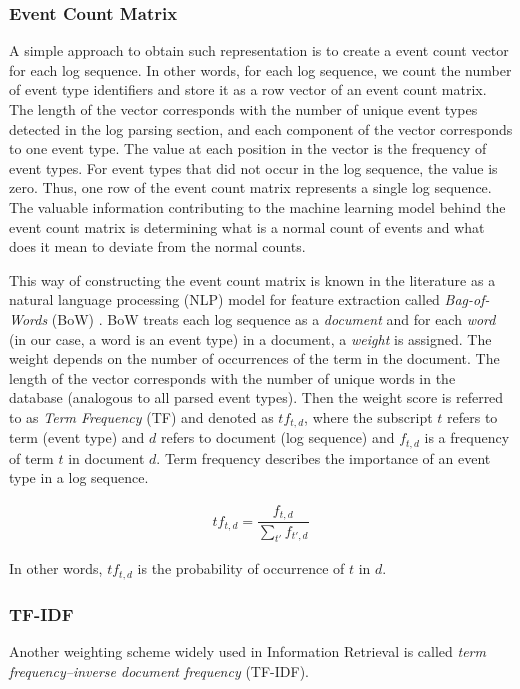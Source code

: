 \subsubsection*{Event Count Matrix}
A simple approach to obtain such representation is to create a event count vector for each log sequence. In other words, for each log sequence, we count the number of event type identifiers and store it as a row vector of an event count matrix. The length of the vector corresponds with the number of unique event types detected in the log parsing section, and each component of the vector corresponds to one event type. The value at each position in the vector is the frequency of event types. For event types that did not occur in the log sequence, the value is zero. Thus, one row of the event count matrix represents a single log sequence. The valuable information contributing to the machine learning model behind the event count matrix is determining what is a normal count of events and what does it mean to deviate from the normal counts.


This way of constructing the event count matrix is known in the literature as a natural language processing (NLP) model for feature extraction called \textit{Bag-of-Words} (BoW) \cite{informationRetrieval2008}. BoW treats each log sequence as a \textit{document} and for each \textit{word} (in our case, a word is an event type) in a document, a \textit{weight} is assigned. The weight depends on the number of occurrences of the term in the document. The length of the vector corresponds with the number of unique words in the database (analogous to all parsed event types). Then the weight score is referred to as \textit{Term Frequency} (TF) and denoted as $tf_{t,d}$, where the subscript $t$ refers to term (event type) and $d$ refers to document (log sequence) and $f_{t,d}$ is a frequency of term $t$ in document $d$. Term frequency describes the importance of an event type in a log sequence.

\begin{gather}
    tf_{t,d} = \dfrac{f_{t,d}}{\sum_{t'}f_{t', d}}
\end{gather}

In other words, $tf_{t, d}$ is the probability of occurrence of $t$ in $d$.

\subsubsection*{TF-IDF}
Another weighting scheme widely used in Information Retrieval is called \textit{term frequency–inverse document frequency} (TF-IDF). 


